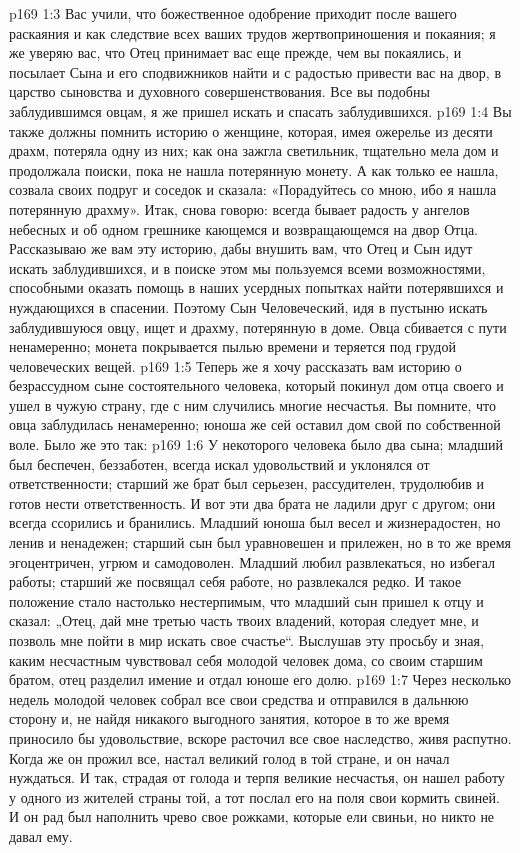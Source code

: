 \vs p169 1:3 Вас учили, что божественное одобрение приходит после вашего раскаяния и как следствие всех ваших трудов жертвоприношения и покаяния; я же уверяю вас, что Отец принимает вас еще прежде, чем вы покаялись, и посылает Сына и его сподвижников найти и с радостью привести вас на двор, в царство сыновства и духовного совершенствования. Все вы подобны заблудившимся овцам, я же пришел искать и спасать заблудившихся.
\vs p169 1:4 Вы также должны помнить историю о женщине, которая, имея ожерелье из десяти драхм, потеряла одну из них; как она зажгла светильник, тщательно мела дом и продолжала поиски, пока не нашла потерянную монету. А как только ее нашла, созвала своих подруг и соседок и сказала: «Порадуйтесь со мною, ибо я нашла потерянную драхму». Итак, снова говорю: всегда бывает радость у ангелов небесных и об одном грешнике кающемся и возвращающемся на двор Отца. Рассказываю же вам эту историю, дабы внушить вам, что Отец и Сын идут искать заблудившихся, и в поиске этом мы пользуемся всеми возможностями, способными оказать помощь в наших усердных попытках найти потерявшихся и нуждающихся в спасении. Поэтому Сын Человеческий, идя в пустыню искать заблудившуюся овцу, ищет и драхму, потерянную в доме. Овца сбивается с пути ненамеренно; монета покрывается пылью времени и теряется под грудой человеческих вещей.
\vs p169 1:5 Теперь же я хочу рассказать вам историю о безрассудном сыне состоятельного человека, который  покинул дом отца своего и ушел в чужую страну, где с ним случились многие несчастья. Вы помните, что овца заблудилась ненамеренно; юноша же сей оставил дом свой по собственной воле. Было же это так:
\vs p169 1:6 \pc У некоторого человека было два сына; младший был беспечен, беззаботен, всегда искал удовольствий и уклонялся от ответственности; старший же брат был серьезен, рассудителен, трудолюбив и готов нести ответственность. И вот эти два брата не ладили друг с другом; они всегда ссорились и бранились. Младший юноша был весел и жизнерадостен, но ленив и ненадежен; старший сын был уравновешен и прилежен, но в то же время эгоцентричен, угрюм и самодоволен. Младший любил развлекаться, но избегал работы; старший же посвящал себя работе, но развлекался редко. И такое положение стало настолько нестерпимым, что младший сын пришел к отцу и сказал: „Отец, дай мне третью часть твоих владений, которая следует мне, и позволь мне пойти в мир искать свое счастье“. Выслушав эту просьбу и зная, каким несчастным чувствовал себя молодой человек дома, со своим старшим братом, отец разделил имение и отдал юноше его долю.
\vs p169 1:7 Через несколько недель молодой человек собрал все свои средства и отправился в дальнюю сторону и, не найдя никакого выгодного занятия, которое в то же время приносило бы удовольствие, вскоре расточил все свое наследство, живя распутно. Когда же он прожил все, настал великий голод в той стране, и он начал нуждаться. И так, страдая от голода и терпя великие несчастья, он нашел работу у одного из жителей страны той, а тот послал его на поля свои кормить свиней. И он рад был наполнить чрево свое рожками, которые ели свиньи, но никто не давал ему.
